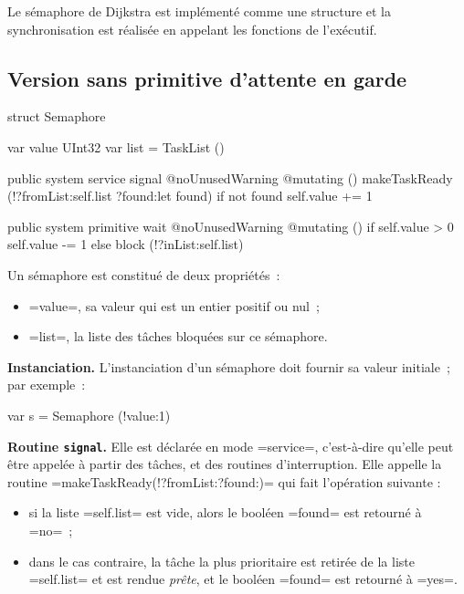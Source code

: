 
Le sémaphore de Dijkstra est implémenté comme une structure et la synchronisation est réalisée en appelant les fonctions de l'exécutif.


\subsection{Version sans primitive d'attente en garde}


\begin{PLM}
struct Semaphore {
  var value UInt32
  var list = TaskList ()
  
  public system service signal @noUnusedWarning @mutating () {
    makeTaskReady (!?fromList:self.list ?found:let found)
    if not found {
      self.value += 1
    }
  }

  public system primitive wait @noUnusedWarning @mutating () {
    if self.value > 0 {
      self.value -= 1
    }else{
      block (!?inList:self.list)
    }
  }
}
\end{PLM}

Un sémaphore est constitué de deux propriétés~:
\begin{itemize}
  \item \plm=value=, sa valeur qui est un entier positif ou nul~;
  \item \plm=list=, la liste des tâches bloquées sur ce sémaphore.
\end{itemize}


{\bf Instanciation.} L'instanciation d'un sémaphore doit fournir sa valeur initiale~; par exemple~:
\begin{PLM}
var s = Semaphore (!value:1)
\end{PLM}

{\bf Routine \texttt{signal}.} Elle est déclarée en mode \plm=service=, c'est-à-dire qu'elle peut être appelée à partir des tâches, et des routines d'interruption. Elle appelle la routine \plm=makeTaskReady(!?fromList:?found:)= qui fait l'opération suivante :
\begin{itemize}
  \item si la liste \plm=self.list= est vide, alors le booléen \plm=found= est retourné à \plm=no=~;
  \item dans le cas contraire, la tâche la plus prioritaire est retirée de la liste \plm=self.list= et est rendue \emph{prête}, et le booléen \plm=found= est retourné à \plm=yes=.
\end{itemize}


